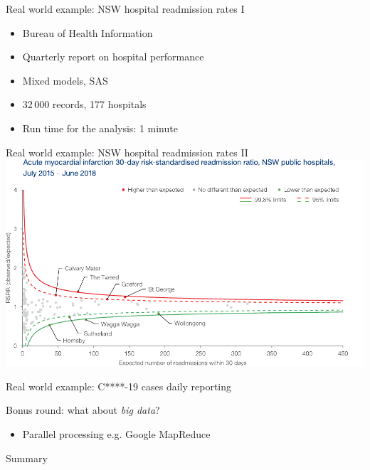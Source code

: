 \documentclass[aspectratio=169,12pt,usepdftitle=false]{beamer} %
\begin{document}
\begin{frame}{Real world example: NSW hospital readmission rates I}
    \begin{itemize}
	\item Bureau of Health Information
	\item Quarterly report on hospital performance
	\item Mixed models, SAS
	\item 32\,000 records, 177 hospitals
	\item Run time for the analysis: 1 minute
    \end{itemize}
\end{frame}

\begin{frame}{Real world example: NSW hospital readmission rates II}
\centering
\includegraphics[height=0.8\textheight]
	{ref/ami-rsrr.pdf}


\end{frame}

\begin{frame}{Real world example: C****-19 cases daily reporting}
\end{frame}

\begin{frame}{Bonus round: what about \emph{big data}?}
    \begin{itemize}
	\item Parallel processing e.g. Google MapReduce
    \end{itemize}
\end{frame}

\begin{frame}{Summary}
\end{frame}
\end{document}

